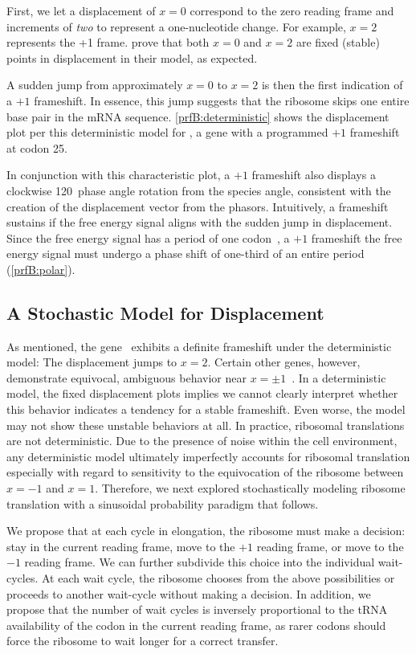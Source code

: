 \documentclass[12pt, draft]{article}
\numberwithin{equation}{section}
\begin{document}
First, we let a displacement of $x = 0$ correspond to the zero reading frame and increments of
\emph{two} to represent a one-nucleotide change. For example, $x =2$ represents the +1 frame.
\citet{lalit:embs} prove that both $x = 0$ and $x = 2$ are fixed (stable) points in displacement in their model,
as expected.

A sudden jump from approximately $x = 0$ to $x = 2$ is then the first indication of a $+1$ frameshift.
In essence, this jump suggests that the ribosome skips one entire base pair in the mRNA sequence.
\autoref{prfB:deterministic} shows the displacement plot per this deterministic model for \prfB, 
a gene with a programmed $+1$ frameshift at codon 25.

In conjunction with this characteristic plot, a $+1$ frameshift also displays a clockwise 120\degree\
phase angle rotation from the species angle, consistent with the
creation of the displacement vector from the phasors.
Intuitively, a frameshift sustains if the free energy signal aligns with the sudden jump in displacement.
Since the free energy signal has a period of one codon~\cite{lalit:mechanics}, a $+1$ frameshift the free energy signal
must undergo a phase shift of one-third of an entire period (\autoref{prfB:polar}).

\subsection{A Stochastic Model for Displacement}
\label{stochastic}

As mentioned, the gene \prfB\ exhibits a definite frameshift under the
deterministic model: The displacement jumps to $x=2$.  Certain other
genes, however, demonstrate equivocal, ambiguous behavior near $x = \pm
1$~\cite{lalit:embs}.  In a deterministic model, the fixed
displacement plots implies we cannot clearly interpret whether this
behavior indicates a tendency for a stable frameshift. Even worse,
the model may not show these unstable behaviors at all. In practice,
ribosomal translations are not deterministic. Due to the presence of
noise within the cell environment, any deterministic model ultimately
imperfectly accounts for ribosomal translation especially with regard
to sensitivity to the equivocation of the ribosome between $x=-1$ and
$x=1$. Therefore, we next explored stochastically modeling ribosome
translation with a sinusoidal probability paradigm that follows.

We propose that at each cycle in elongation, the ribosome must make a
decision: stay in the current reading frame, move to the $+1$ reading
frame, or move to the $-1$ reading frame.  We can further subdivide
this choice into the individual wait-cycles.  At each wait cycle, the
ribosome chooses from the above possibilities or proceeds to another
wait-cycle without making a decision.  In addition, we propose that the 
number of wait cycles is inversely proportional to the tRNA availability of 
the codon in the current reading frame, as rarer codons should force the 
ribosome to wait longer for a correct transfer.
\end{document}
